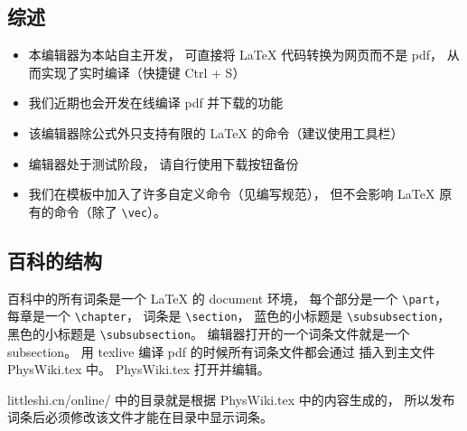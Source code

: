 
\subsection{综述}
\begin{itemize}
\item 本编辑器为本站自主开发， 可直接将 LaTeX 代码转换为网页而不是 pdf， 从而实现了实时编译（快捷键 Ctrl + S）
\item 我们近期也会开发在线编译 pdf 并下载的功能
\item 该编辑器除公式外只支持有限的 LaTeX 的命令（建议使用工具栏）
\item 编辑器处于测试阶段， 请自行使用下载按钮备份
\item 我们在模板中加入了许多自定义命令（见编写规范）， 但不会影响 LaTeX 原有的命令（除了 \lstinline|\vec|）。
\end{itemize}

\subsection{百科的结构}

百科中的所有词条是一个 LaTeX 的 document 环境， 每个部分是一个 \lstinline|\part|， 每章是一个 \lstinline|\chapter|， 词条是 \lstinline|\section|， 蓝色的小标题是 \lstinline|\subsubsection|， 黑色的小标题是 \lstinline|\subsubsection|。 编辑器打开的一个词条文件就是一个 subsection。 用 texlive 编译 pdf 的时候所有词条文件都会通过 \lstinline|| 插入到主文件 PhysWiki.tex 中。 PhysWiki.tex 打开并编辑。

littleshi.cn/online/ 中的目录就是根据 PhysWiki.tex 中的内容生成的， 所以发布词条后必须修改该文件才能在目录中显示词条。

